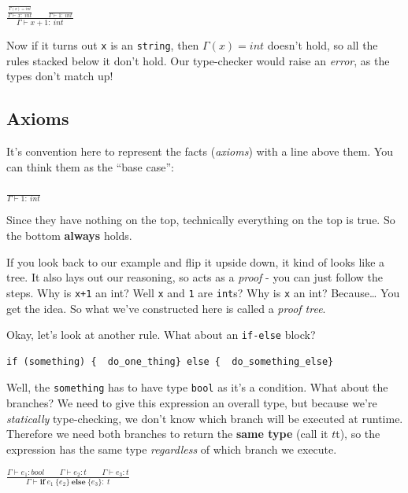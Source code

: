 {{{{\(\frac{\frac{\frac{}{\Gamma(x) = int}}{\Gamma \vdash x:\ int}\text{~~~~~~}\frac{}{\Gamma \vdash 1:\ int}}{\Gamma \vdash x + 1:\ int}\)}}

Now if it turns out \texttt{x} is an \texttt{string}, then
{{{\(\Gamma(x) = int\)}}} doesn't
hold, so all the rules stacked below it don't hold. Our type-checker
would raise an \emph{error}, as the types don't match up!

\hypertarget{axioms}{%
\subsection{\texorpdfstring{\protect\hyperlink{axioms}{}Axioms}{Axioms}}\label{axioms}}

It's convention here to represent the facts (\emph{axioms}) with a line
above them. You can think them as the ``base case'':

{{{\(\frac{}{\Gamma \vdash 1:\ int}\)}}}

Since they have nothing on the top, technically everything on the top is
true. So the bottom \textbf{always} holds.

If you look back to our example and flip it upside down, it kind of
looks like a tree. It also lays out our reasoning, so acts as a
\emph{proof} - you can just follow the steps. Why is \texttt{x+1} an
int? Well \texttt{x} and \texttt{1} are \texttt{int}s? Why is \texttt{x}
an int? Because\ldots{} You get the idea. So what we've constructed here
is called a \emph{proof tree}.

Okay, let's look at another rule. What about an \texttt{if-else} block?


\begin{verbatim}
if (something) {  do_one_thing} else {  do_something_else}
\end{verbatim}

Well, the \texttt{something} has to have type \texttt{bool} as it's a
condition. What about the branches? We need to give this expression an
overall type, but because we're \emph{statically} type-checking, we
don't know which branch will be executed at runtime. Therefore we need
both branches to return the \textbf{same type} (call it
{{{\(t\)}{{{}{t}}}}}), so the expression has the same type
\emph{regardless} of which branch we execute.

{{{\(\frac{\Gamma \vdash e_{1}:bool\text{~~~~~~}\Gamma \vdash e_{2}:t\text{~~~~~~}\Gamma \vdash e_{3}:t}{\Gamma \vdash {\mathbf{i}\mathbf{f}}\ e_{1}\ \{ e_{2}\}\ {\mathbf{e}\mathbf{l}\mathbf{s}\mathbf{e}}\ \{ e_{3}\}:\ t}\)}}}

}}
